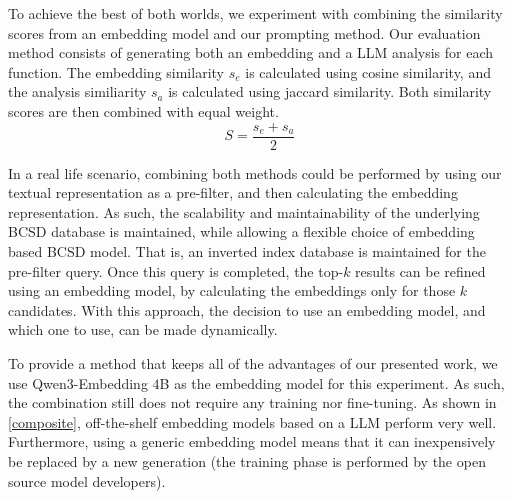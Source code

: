 To achieve the best of both worlds, we experiment with combining the similarity scores from an embedding model and our prompting method.
Our evaluation method consists of generating both an embedding and a LLM analysis for each function. The embedding similarity \(s_e\) is calculated
using cosine similarity, and the analysis similiarity \(s_a\) is calculated using jaccard similarity. Both similarity scores are then combined
with equal weight.
\[
    S = \frac{s_e + s_a}{2}
\]

In a real life scenario, combining both methods could be performed by using our textual representation as a pre-filter, and then calculating
the embedding representation. As such, the scalability and maintainability of the underlying BCSD database is maintained, while allowing a flexible
choice of embedding based BCSD model. That is, an inverted index database is maintained for the pre-filter query. Once this query is completed, the
top-\(k\) results can be refined using an embedding model, by calculating the embeddings only for those \(k\) candidates. With this approach,
the decision to use an embedding model, and which one to use, can be made dynamically.

To provide a method that keeps all of the advantages of our presented work, we use Qwen3-Embedding \(4\)B as the embedding model for this experiment.
As such, the combination still does not require any training nor fine-tuning. As shown in \autoref{composite}, off-the-shelf embedding models
based on a LLM perform very well. Furthermore, using a generic embedding model means that it can inexpensively be replaced by a new generation
(the training phase is performed by the open source model developers).

